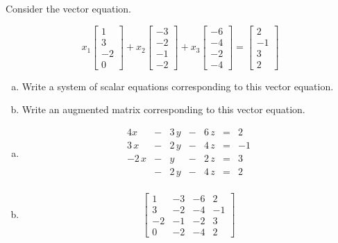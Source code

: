 
\begin{exerciseStatement}


Consider the vector equation.

\[ x_{1} \left[\begin{array}{c}
1 \\
3 \\
-2 \\
0
\end{array}\right] + x_{2} \left[\begin{array}{c}
-3 \\
-2 \\
-1 \\
-2
\end{array}\right] + x_{3} \left[\begin{array}{c}
-6 \\
-4 \\
-2 \\
-4
\end{array}\right] = \left[\begin{array}{c}
2 \\
-1 \\
3 \\
2
\end{array}\right] \]
\begin{enumerate}[(a)]
\item  Write a system of scalar equations corresponding to this vector equation. 
\item  Write an augmented matrix corresponding to this vector equation. 
\end{enumerate}
    
\end{exerciseStatement}
    
\begin{exerciseAnswer} 

\begin{enumerate}[(a)]
\item 
\begin{alignat*}{4} x &-& 3 \, y &-& 6 \, z &=& 2 \\3 \, x &-& 2 \, y &-& 4 \, z &=& -1 \\-2 \, x &-& y &-& 2 \, z &=& 3 \\ &-& 2 \, y &-& 4 \, z &=& 2 \\ \end{alignat*}
            
\item \[ \left[\begin{array}{ccc|c}
1 & -3 & -6 & 2 \\
3 & -2 & -4 & -1 \\
-2 & -1 & -2 & 3 \\
0 & -2 & -4 & 2
\end{array}\right] \]
\end{enumerate}
    
\end{exerciseAnswer}
    
